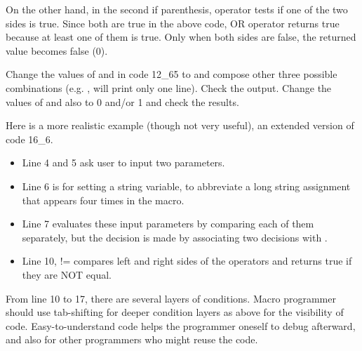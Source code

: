On the other hand, in the second if parenthesis,
\ilcom{||} operator tests if one of the two sides is true. Since both are
true in the above code, OR operator returns true because at least one of them is
true. Only when both sides are false, the returned value becomes false (0).

\begin{indentexercise}{1}
Change the values of  and  in code 12\_65 to  and
compose other three possible combinations (e.g. ,  will print
only one line).
Check the output. Change the values of  and  also to 0 and/or
1 and check the results. 
\end{indentexercise}

Here is a more realistic example (though not very useful), an extended version
of code 16\_6.

\begin{itemize}
\item Line 4 and 5 ask user to input two parameters.
\item Line 6 is for setting a string variable, to abbreviate a long string assignment that appears four times in the macro.
\item Line 7 evaluates these input parameters by comparing each of them separately, but the decision is made by associating two decisions with \ilcom{\&\&}. 
\item Line 10, != compares left and right sides of the operators and returns true if they are NOT equal.   
\end{itemize}
From line 10 to 17, there are several layers of conditions. Macro programmer should use tab-shifting for deeper condition layers as above for the visibility of code. Easy-to-understand code helps the programmer oneself to debug afterward, and also for other programmers who might reuse the code.
